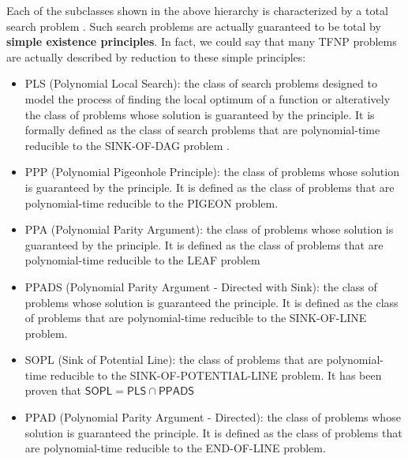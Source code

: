 Each of the subclasses shown in the above hierarchy is characterized by a total search problem \cite{proofs_circuits_communication,tfnp_characterization}. Such search problems are actually guaranteed to be total by \textbf{simple existence principles}. In fact, we could say that many \textsf{TFNP} problems are actually described by reduction to these simple principles:
\begin{itemize}
    \item \textsf{PLS} (Polynomial Local Search): the class of search problems designed to model the process of finding the local optimum of a function or alteratively the class of problems whose solution is guaranteed by the  principle. It is formally defined as the class of search problems that are polynomial-time reducible to the SINK-OF-DAG problem .
    
    \item \textsf{PPP} (Polynomial Pigeonhole Principle): the class of problems whose solution is guaranteed by the  principle. It is defined as the class of problems that are polynomial-time reducible to the PIGEON problem.
    
    \item \textsf{PPA} (Polynomial Parity Argument): the class of problems whose solution is guaranteed by the  principle. It is defined as the class of problems that are polynomial-time reducible to the LEAF problem
    
    \item \textsf{PPADS} (Polynomial Parity Argument - Directed with Sink): the class of problems whose solution is guaranteed the  principle. It is defined as the class of problems that are polynomial-time reducible to the SINK-OF-LINE problem.
    
    \item \textsf{SOPL} (Sink of Potential Line): the class of problems that are polynomial-time reducible to the SINK-OF-POTENTIAL-LINE problem. It has been proven that $\mathsf{SOPL} = \mathsf{PLS} \cap \mathsf{PPADS}$ \cite{Further_collapses_TFNP}
    
    \item \textsf{PPAD} (Polynomial Parity Argument - Directed): the class of problems whose solution is guaranteed the  principle. It is defined as the class of problems that are polynomial-time reducible to the END-OF-LINE problem.
    

\end{itemize}
